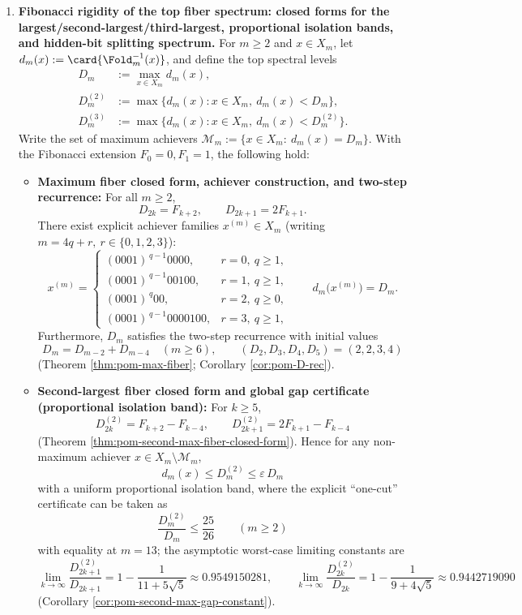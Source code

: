 \begin{enumerate}
  \item \textbf{Fibonacci rigidity of the top fiber spectrum: closed forms for the largest/second-largest/third-largest, proportional isolation bands, and hidden-bit splitting spectrum.}
  For \(m\ge 2\) and \(x\in X_m\), let
  \(
  d_m(x):=\card{\Fold_m^{-1}(x)}
  \), and define the top spectral levels
  \[
  \begin{aligned}
  D_m &:=\max_{x\in X_m} d_m(x),\\
  D_m^{(2)} &:=\max\{d_m(x):x\in X_m,\ d_m(x)<D_m\},\\
  D_m^{(3)} &:=\max\{d_m(x):x\in X_m,\ d_m(x)<D_m^{(2)}\}.
  \end{aligned}
  \]
  Write the set of maximum achievers \(\mathcal{M}_m:=\{x\in X_m:\ d_m(x)=D_m\}\).
  With the Fibonacci extension \(F_0=0,F_1=1\), the following hold:
  \begin{itemize}
    \item \textbf{Maximum fiber closed form, achiever construction, and two-step recurrence:} For all \(m\ge 2\),
    \[
    D_{2k}=F_{k+2},\qquad D_{2k+1}=2F_{k+1}.
    \]
    There exist explicit achiever families \(x^{(m)}\in X_m\) (writing \(m=4q+r,\ r\in\{0,1,2,3\}\)):
    \[
    x^{(m)}=
    \begin{cases}
    (0001)^{\,q-1}0000,& r=0,\ q\ge 1,\\[2pt]
    (0001)^{\,q-1}00100,& r=1,\ q\ge 1,\\[2pt]
    (0001)^{\,q}00,& r=2,\ q\ge 0,\\[2pt]
    (0001)^{\,q-1}0000100,& r=3,\ q\ge 1,
    \end{cases}
    \qquad
    d_m\!\bigl(x^{(m)}\bigr)=D_m.
    \]
    Furthermore, \(D_m\) satisfies the two-step recurrence with initial values
    \[
    D_m=D_{m-2}+D_{m-4}\quad(m\ge 6),\qquad (D_2,D_3,D_4,D_5)=(2,2,3,4)
    \]
    (Theorem \ref{thm:pom-max-fiber}; Corollary \ref{cor:pom-D-rec}).

    \item \textbf{Second-largest fiber closed form and global gap certificate (proportional isolation band):} For \(k\ge 5\),
    \[
    D_{2k}^{(2)}=F_{k+2}-F_{k-4},\qquad
    D_{2k+1}^{(2)}=2F_{k+1}-F_{k-4}
    \]
    (Theorem \ref{thm:pom-second-max-fiber-closed-form}).
    Hence for any non-maximum achiever \(x\in X_m\setminus\mathcal{M}_m\),
    \[
    d_m(x)\le D_m^{(2)}\le \varepsilon\,D_m
    \]
    with a uniform proportional isolation band, where the explicit ``one-cut'' certificate can be taken as
    \[
    \boxed{\;\frac{D_m^{(2)}}{D_m}\le \frac{25}{26}\qquad(m\ge 2)\;}
    \]
    with equality at \(m=13\); the asymptotic worst-case limiting constants are
    \[
    \lim_{k\to\infty}\frac{D_{2k+1}^{(2)}}{D_{2k+1}}
    =1-\frac{1}{11+5\sqrt5}\approx 0.9549150281,
    \qquad
    \lim_{k\to\infty}\frac{D_{2k}^{(2)}}{D_{2k}}
    =1-\frac{1}{9+4\sqrt5}\approx 0.9442719090
    \]
    (Corollary \ref{cor:pom-second-max-gap-constant}).


\end{itemize}
\end{enumerate}
